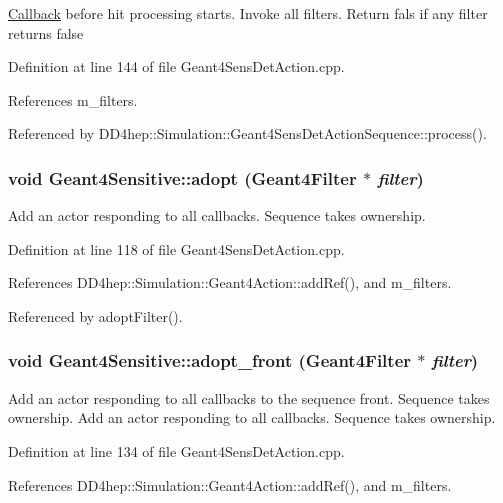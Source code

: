 \hyperlink{class_d_d4hep_1_1_callback}{Callback} before hit processing starts. Invoke all filters. Return fals if any filter returns false 

Definition at line 144 of file Geant4SensDetAction.cpp.

References m\_\-filters.

Referenced by DD4hep::Simulation::Geant4SensDetActionSequence::process().\hypertarget{class_d_d4hep_1_1_simulation_1_1_geant4_sensitive_ac1a68f5a62579041a301c8f3b3389175}{
\subsubsection[{adopt}]{\setlength{\rightskip}{0pt plus 5cm}void Geant4Sensitive::adopt ({\bf Geant4Filter} $\ast$ {\em filter})}}
\label{class_d_d4hep_1_1_simulation_1_1_geant4_sensitive_ac1a68f5a62579041a301c8f3b3389175}


Add an actor responding to all callbacks. Sequence takes ownership. 

Definition at line 118 of file Geant4SensDetAction.cpp.

References DD4hep::Simulation::Geant4Action::addRef(), and m\_\-filters.

Referenced by adoptFilter().\hypertarget{class_d_d4hep_1_1_simulation_1_1_geant4_sensitive_a38dc5d69581c1acf08eb7aed152cf3f6}{
\subsubsection[{adopt\_\-front}]{\setlength{\rightskip}{0pt plus 5cm}void Geant4Sensitive::adopt\_\-front ({\bf Geant4Filter} $\ast$ {\em filter})}}
\label{class_d_d4hep_1_1_simulation_1_1_geant4_sensitive_a38dc5d69581c1acf08eb7aed152cf3f6}


Add an actor responding to all callbacks to the sequence front. Sequence takes ownership. Add an actor responding to all callbacks. Sequence takes ownership. 

Definition at line 134 of file Geant4SensDetAction.cpp.

References DD4hep::Simulation::Geant4Action::addRef(), and m\_\-filters.

